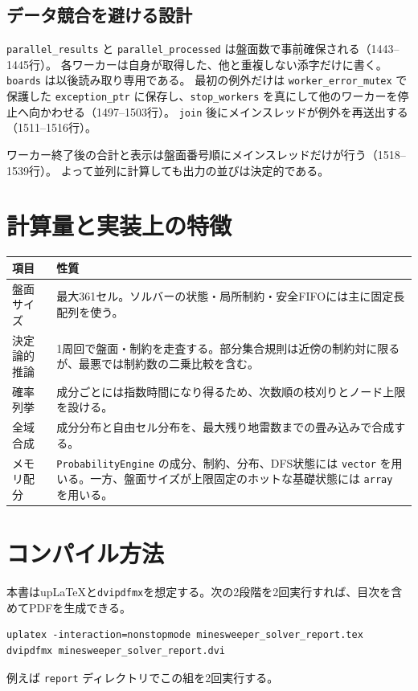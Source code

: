 \documentclass[uplatex,dvipdfmx,11pt]{jsarticle}
\newcommand{\code}[1]{\texttt{#1}}
\begin{document}
\subsection{データ競合を避ける設計}
\code{parallel\_results} と \code{parallel\_processed} は盤面数で事前確保される（1443--1445行）。
各ワーカーは自身が取得した、他と重複しない添字だけに書く。
\code{boards} は以後読み取り専用である。
最初の例外だけは \code{worker\_error\_mutex} で保護した \code{exception\_ptr} に保存し、\code{stop\_workers} を真にして他のワーカーを停止へ向かわせる（1497--1503行）。
\code{join} 後にメインスレッドが例外を再送出する（1511--1516行）。

ワーカー終了後の合計と表示は盤面番号順にメインスレッドだけが行う（1518--1539行）。
よって並列に計算しても出力の並びは決定的である。

\section{計算量と実装上の特徴}

\begin{longtable}{p{36mm}p{91mm}}
\toprule
項目 & 性質 \\
\midrule
\endhead
盤面サイズ & 最大361セル。ソルバーの状態・局所制約・安全FIFOには主に固定長配列を使う。\\
決定論的推論 & 1周回で盤面・制約を走査する。部分集合規則は近傍の制約対に限るが、最悪では制約数の二乗比較を含む。\\
確率列挙 & 成分ごとには指数時間になり得るため、次数順の枝刈りとノード上限を設ける。\\
全域合成 & 成分分布と自由セル分布を、最大残り地雷数までの畳み込みで合成する。\\
メモリ配分 & \code{ProbabilityEngine} の成分、制約、分布、DFS状態には \code{vector} を用いる。一方、盤面サイズが上限固定のホットな基礎状態には \code{array} を用いる。\\
\bottomrule
\end{longtable}

\section{コンパイル方法}
本書はup\LaTeX{}と\code{dvipdfmx}を想定する。次の2段階を2回実行すれば、目次を含めてPDFを生成できる。

\begin{lstlisting}
uplatex -interaction=nonstopmode minesweeper_solver_report.tex
dvipdfmx minesweeper_solver_report.dvi
\end{lstlisting}

例えば \code{report} ディレクトリでこの組を2回実行する。
\end{document}
